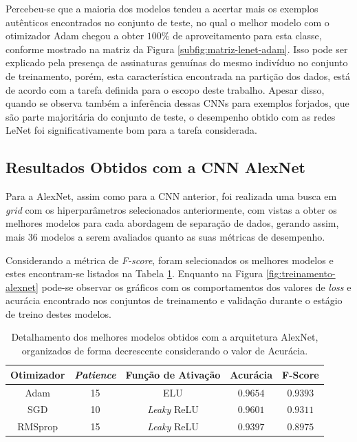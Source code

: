 Percebeu-se que a maioria dos modelos tendeu a acertar mais os exemplos autênticos encontrados no conjunto de teste, no qual o melhor modelo com o otimizador Adam chegou a obter $100\%$ de aproveitamento para esta classe, conforme mostrado na matriz da Figura \ref{subfig:matriz-lenet-adam}. Isso pode ser explicado pela presença de assinaturas genuínas do mesmo indivíduo no conjunto de treinamento, porém, esta característica encontrada na partição dos dados, está de acordo com a tarefa definida para o escopo deste trabalho. Apesar disso, quando se observa também a inferência dessas CNNs para exemplos forjados, que são parte majoritária do conjunto de teste, o desempenho obtido com as redes LeNet foi significativamente bom para a tarefa considerada.

\subsection{Resultados Obtidos com a CNN AlexNet}
\label{sec:alexnet}

 Para a AlexNet, assim como para a CNN anterior, foi realizada uma busca em \emph{grid} com os hiperparâmetros selecionados anteriormente, com vistas a obter os melhores modelos para cada abordagem de separação de dados, gerando assim, mais 36 modelos a serem avaliados quanto as suas métricas de desempenho.

 Considerando a métrica de \emph{F-score}, foram selecionados os melhores modelos e estes encontram-se listados na Tabela \ref{tab:alexnet}. Enquanto na Figura \ref{fig:treinamento-alexnet} pode-se observar os gráficos com os comportamentos dos valores de \emph{loss} e acurácia encontrado nos conjuntos de treinamento e validação durante o estágio de treino destes modelos.

 \begin{table}[h!]
 \centering
 \caption{Detalhamento dos melhores modelos obtidos com a arquitetura AlexNet, organizados de forma decrescente considerando o valor de Acurácia.}
 \label{tab:alexnet}
 \begin{tabular}{ccccc}
 \toprule
 \textbf{Otimizador} & \textbf{\emph{Patience}}  & \textbf{Função de Ativação} & \textbf{Acurácia} & \textbf{F-Score} \\
 \midrule
 Adam & 15 & ELU & $0.9654$ & $0.9393$ \\
 SGD & 10 & \emph{Leaky} ReLU & $0.9601$ & $0.9311$ \\
 RMSprop & 15 & \emph{Leaky} ReLU & $0.9397$ & $0.8975$ \\
 \bottomrule
 \end{tabular}
\end{table}


